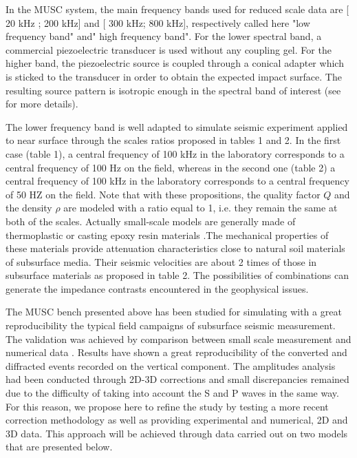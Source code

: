\documentclass[manuscript,revised]{geophysics}
\begin{document}
\noindent In the MUSC system, the main frequency bands used for reduced scale data are [ 20 kHz ; 200 kHz] and [ 300 kHz; 800 kHz], respectively called here "low frequency band" and" high frequency band". For the lower spectral band, a commercial piezoelectric transducer is used without any coupling gel. For the higher band, the piezoelectric source is coupled through a conical adapter which is sticked to the transducer in order to obtain the expected impact surface. The resulting source pattern is isotropic enough in the spectral band of interest (see \citep{Bretaudeau_SSM_2011} for more details).

\noindent The lower frequency band is well adapted to simulate seismic experiment applied to near surface through the scales ratios proposed in tables 1 and 2. In the first case (table 1), a central frequency of 100 kHz in the laboratory corresponds to a central frequency of 100 Hz on the field, whereas in the second one (table 2) a central frequency of 100 kHz in the laboratory corresponds to a central frequency of 50 HZ on the field. Note that with these propositions, the  quality factor $Q$ and the density $\rho$ are modeled with a ratio equal to 1, i.e. they remain the same at both of the scales. Actually small-scale models are generally made of thermoplastic or casting epoxy resin materials \citep{Bretaudeau_FWI_2013}.The mechanical properties of these materials provide attenuation characteristics close to natural soil materials of subsurface media. Their seismic velocities are about 2 times of those in subsurface materials as proposed in table 2. The possibilities of combinations can generate the impedance contrasts encountered in the geophysical issues. 

\noindent The MUSC bench presented above has been studied for simulating with a great reproducibility the typical field campaigns of subsurface seismic measurement. The validation was achieved by comparison between small scale measurement and numerical data \citep{Bretaudeau_SSM_2011}. Results have shown a great reproducibility of the converted and diffracted events recorded on the vertical component. The amplitudes analysis had been conducted through 2D-3D corrections and small discrepancies remained due to the difficulty of taking into account the S and P waves in the same way. For this reason, we propose here to refine the study by testing a more recent correction methodology \citet{Schafer_LSS_2014} as well as providing experimental and numerical, 2D and 3D data. This approach will be achieved through data carried out on two models that are presented below.
\end{document}

